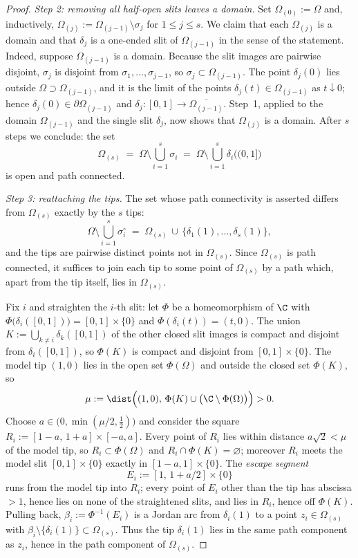 \begin{proof}
\emph{Step 2: removing all half-open slits leaves a domain.}
Set $\Omega_{(0)}:=\Omega$ and, inductively,
$\Omega_{(j)}:=\Omega_{(j-1)}\setminus\sigma_j$ for $1\le j\le s$. We claim that each
$\Omega_{(j)}$ is a domain and that $\delta_j$ is a one-ended slit of $\Omega_{(j-1)}$
in the sense of the statement. Indeed, suppose $\Omega_{(j-1)}$ is a domain. Because the
slit images are pairwise disjoint, $\sigma_j$ is disjoint from
$\sigma_1,\dots,\sigma_{j-1}$, so $\sigma_j\subset\Omega_{(j-1)}$. The point
$\delta_j(0)$ lies outside $\Omega\supset\Omega_{(j-1)}$, and it is the limit of the
points $\delta_j(t)\in\Omega_{(j-1)}$ as $t\downarrow0$; hence
$\delta_j(0)\in\partial\Omega_{(j-1)}$ and
$\delta_j\colon[0,1]\to\overline{\Omega_{(j-1)}}$. Step~1, applied to the domain
$\Omega_{(j-1)}$ and the single slit $\delta_j$, now shows that $\Omega_{(j)}$ is a
domain. After $s$ steps we conclude: the set
\[
\Omega_{(s)}\;=\;\Omega\setminus\bigcup_{i=1}^{s}\sigma_i
\;=\;\Omega\setminus\bigcup_{i=1}^{s}\delta_i\bigl((0,1]\bigr)
\]
is open and path connected.

\emph{Step 3: reattaching the tips.}
The set whose path connectivity is asserted differs from $\Omega_{(s)}$ exactly by the
$s$ tips:
\[
\Omega\setminus\bigcup_{i=1}^{s}\sigma_i^{\circ}
\;=\;\Omega_{(s)}\,\cup\,\{\delta_1(1),\dots,\delta_s(1)\},
\]
and the tips are pairwise distinct points not in $\Omega_{(s)}$. Since $\Omega_{(s)}$ is
path connected, it suffices to join each tip to some point of $\Omega_{(s)}$ by a path
which, apart from the tip itself, lies in $\Omega_{(s)}$.

Fix $i$ and straighten the $i$-th slit: let $\Phi$ be a homeomorphism of $\C$ with
$\Phi\bigl(\delta_i([0,1])\bigr)=[0,1]\times\{0\}$ and $\Phi(\delta_i(t))=(t,0)$. The
union $K:=\bigcup_{k\neq i}\delta_k([0,1])$ of the other closed slit images is compact
and disjoint from $\delta_i([0,1])$, so $\Phi(K)$ is compact and disjoint from
$[0,1]\times\{0\}$. The model tip $(1,0)$ lies in the open set $\Phi(\Omega)$ and
outside the closed set $\Phi(K)$, so
\[
\mu:=\dist\Bigl((1,0),\,\Phi(K)\cup\bigl(\C\setminus\Phi(\Omega)\bigr)\Bigr)>0 .
\]
Choose $a\in\bigl(0,\min(\mu/2,\tfrac12)\bigr)$ and consider the square
$R_i:=[1-a,\,1+a]\times[-a,a]$. Every point of $R_i$ lies within distance $a\sqrt2<\mu$
of the model tip, so $R_i\subset\Phi(\Omega)$ and $R_i\cap\Phi(K)=\varnothing$; moreover
$R_i$ meets the model slit $[0,1]\times\{0\}$ exactly in $[1-a,1]\times\{0\}$. The
\emph{escape segment}
\[
E_i:=[1,\,1+a/2]\times\{0\}
\]
runs from the model tip into $R_i$; every point of $E_i$ other than the tip has abscissa
$>1$, hence lies on none of the straightened slits, and lies in $R_i$, hence off
$\Phi(K)$. Pulling back, $\beta_i:=\Phi^{-1}(E_i)$ is a Jordan arc from $\delta_i(1)$ to
a point $z_i\in\Omega_{(s)}$ with $\beta_i\setminus\{\delta_i(1)\}\subset\Omega_{(s)}$.
Thus the tip $\delta_i(1)$ lies in the same path component as $z_i$, hence in the path
component of $\Omega_{(s)}$.


\end{proof}
